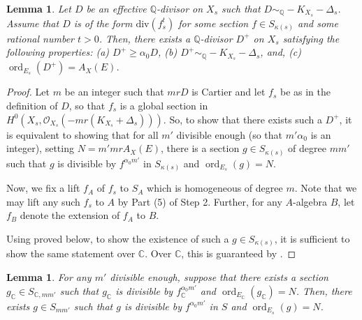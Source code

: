 \documentclass[11pt,reqno]{amsart}
\newcommand{\C}{\mathbb{C}}
\newcommand{\Q}{\mathbb{Q}}
\newcommand{\cO}{\mathcal{O}}
\DeclareMathOperator{\ord}{ord}
\numberwithin{equation}{section}
\newtheorem{lem}[prop] {Lemma}
\theoremstyle{definition}
\begin{document}
\begin{lem} \label{lem:existenceofD+}
    Let $D$ be an effective $\Q$-divisor on $X_s$ such that $D \sim_{\Q} -K_{X_s} - \Delta_s$. Assume that $D$ is of the form $\text{div}(f_s ^t)$ for some section $f \in S_{\kappa(s)}$ and some rational number $t > 0$.
Then, there exists a $\Q$-divisor $D^+$ on $X_s$ satisfying the following properties: (a) $D^+ \geq \alpha_0 D$, (b) $D^{+} \sim_\Q -K_{X_s} - \Delta_s$, and, (c) $\ord_{E_s} (D^+) = A_{X} (E)$.
\end{lem}
\begin{proof}
Let $m$ be an integer such that $mrD$ is Cartier and let $f_s$ be as in the definition of $D$, so that $f_s$ is a global section in $H^0 (X_s, \cO_{X_s}(-mr(K_{X_s}+ \Delta_s))). $ So, to show that there exists such a $D^+$, it is equivalent to showing that for all $m'$ divisible enough (so that $m' \alpha_0$ is an integer), setting $N = m' m r A_X (E)$, there is a section $g \in S_{\kappa(s)}$ of degree $m m'$ such that $g$ is divisible by $f^{ \alpha_0 m' }$ in $S_{\kappa(s)}$ and $\ord_{E_s} (g) = N$.

Now, we fix a lift $f_A$ of $f_s$ to $S_{A}$ which is homogeneous of degree $m$. Note that we may lift any such $f_s$ to $A$ by Part (5) of Step 2. Further, for any $A$-algebra $B$, let $f_B$ denote the extension of $f_A$ to $B$.

    Using  proved below, to show the existence of such a $g \in S_{\kappa(s)}$, it is sufficient to show the same statement over $\C$. Over $\C$, this is guaranteed by \cite[Lemma 4.9]{LiuXuZhuangHigherrankfinitegeneration}.
\end{proof}





\begin{lem} \label{fromCtocharp}
    For any $m'$ divisible enough, suppose that there exists a section $g_\C \in S_{\C,m m'}$ such that $g_\C$ is divisible by $f_{\C}^{ \alpha_0 m' }$ and $\ord_{E_\C} (g_\C) = N$. Then, there exists $g \in S_{m m'}$ such that $g$ is divisible by $f^{ \alpha_0 m' }$ in $S$ and $\ord_{E_s} (g) = N$. 
\end{lem}
\end{document}
